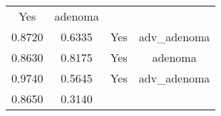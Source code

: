 \documentclass[12pt,]{article}
\begin{document}
\begin{longtable}[]{@{}cccc@{}}
\begin{minipage}[t]{0.22\columnwidth}
Yes\strut
\end{minipage} & \begin{minipage}[t]{0.16\columnwidth}\centering\strut
adenoma\strut
\end{minipage}\tabularnewline
\begin{minipage}[t]{0.24\columnwidth}\centering\strut
0.8720\strut
\end{minipage} & \begin{minipage}[t]{0.26\columnwidth}\centering\strut
0.6335\strut
\end{minipage} & \begin{minipage}[t]{0.22\columnwidth}\centering\strut
Yes\strut
\end{minipage} & \begin{minipage}[t]{0.16\columnwidth}\centering\strut
adv\_adenoma\strut
\end{minipage}\tabularnewline
\begin{minipage}[t]{0.24\columnwidth}\centering\strut
0.8630\strut
\end{minipage} & \begin{minipage}[t]{0.26\columnwidth}\centering\strut
0.8175\strut
\end{minipage} & \begin{minipage}[t]{0.22\columnwidth}\centering\strut
Yes\strut
\end{minipage} & \begin{minipage}[t]{0.16\columnwidth}\centering\strut
adenoma\strut
\end{minipage}\tabularnewline
\begin{minipage}[t]{0.24\columnwidth}\centering\strut
0.9740\strut
\end{minipage} & \begin{minipage}[t]{0.26\columnwidth}\centering\strut
0.5645\strut
\end{minipage} & \begin{minipage}[t]{0.22\columnwidth}\centering\strut
Yes\strut
\end{minipage} & \begin{minipage}[t]{0.16\columnwidth}\centering\strut
adv\_adenoma\strut
\end{minipage}\tabularnewline
\begin{minipage}[t]{0.24\columnwidth}\centering\strut
0.8650\strut
\end{minipage} & \begin{minipage}[t]{0.26\columnwidth}\centering\strut
0.3140\strut
\end{minipage} & \begin{minipage}[t]{0.22\columnwidth}\centering\strut

\end{minipage}
\end{longtable}
\end{document}
